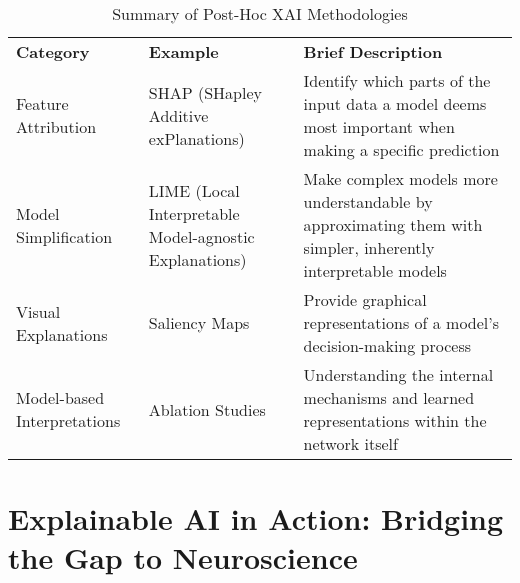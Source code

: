 \begin{table}[H]
    \centering
    \begin{tabular}{|p{}|p{}|p{}|}
        \hline
        \multirow{2}{=}{\textbf{Category}} & \multirow{2}{=}{\textbf{Example}} & \multirow{2}{=}{\textbf{Brief Description}} \\
        & & \\
        \hline
        \multirow{4}{=}{Feature Attribution} & \multirow{4}{=}{SHAP (SHapley Additive exPlanations)} & \multirow{4}{=}{Identify which parts of the input data a model deems most important when making a specific prediction} \\
        & & \\
        & & \\
        & & \\
        \hline
        \multirow{5}{=}{Model Simplification} & \multirow{5}{=}{LIME (Local Interpretable Model-agnostic Explanations)} & \multirow{5}{=}{Make complex models more understandable by approximating them with simpler, inherently interpretable models} \\
        & & \\
        & & \\
        & & \\
        & & \\
        \hline
        \multirow{3}{=}{Visual Explanations} & \multirow{3}{=}{Saliency Maps} & \multirow{3}{=}{Provide graphical representations of a model's decision-making process} \\
        & & \\
        & & \\
        \hline
        \multirow{4}{=}{Model-based Interpretations} & \multirow{4}{=}{Ablation Studies} & \multirow{4}{=}{Understanding the internal mechanisms and learned representations within the network itself} \\
        & & \\
        & & \\
        & & \\
        \hline
    \end{tabular}
    \caption{Summary of Post-Hoc XAI Methodologies}
    \label{tab:xai_taxonomy}
\end{table}

\section{Explainable AI in Action: Bridging the Gap to Neuroscience}

